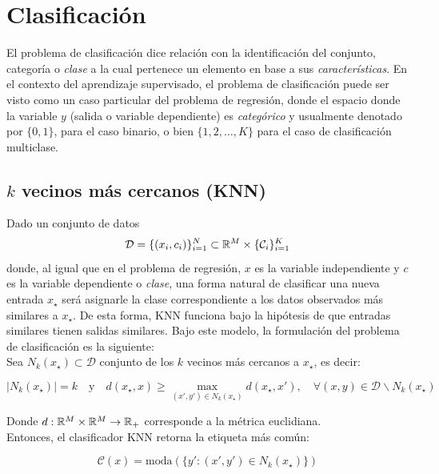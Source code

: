 
\section{Clasificación}
\label{cap:clasificacion}

El problema de clasificación dice relación con la identificación del conjunto, categoría o \emph{clase} a la cual pertenece un elemento en base a sus \emph{características}. En el contexto del aprendizaje supervisado, el problema de clasificación puede ser visto como un caso particular del problema de regresión, donde el espacio donde la variable  $y$ (salida o variable dependiente) es \emph{categórico} y usualmente denotado por $\{0,1\}$, para el caso binario, o bien $\{1,2,\ldots,K\}$ para el caso de clasificación multiclase. 
	
\subsection{$k$ vecinos más cercanos (KNN)}
Dado un conjunto de datos
\begin{equation}
	 	{\mathcal D} = \{(x_i,c_i)\}_{i=1}^N\subset\mathbb{R}^M\times\{{\mathcal C}_i\}_{i=1}^K
\end{equation}
donde, al igual que en el problema de regresión, $x$ es la variable independiente y $c$ es la variable dependiente o \emph{clase}, una forma natural de clasificar una nueva entrada $x_\star$ será asignarle la clase correspondiente a los datos observados más similares a $x_\star$. De esta forma, KNN funciona bajo la hipótesis de que entradas similares tienen salidas similares. Bajo este modelo, la formulación del problema de clasificación es la siguiente:\\

Sea $N_k(x_\star)\subset \mathcal{D}$ conjunto de los $k$ vecinos más cercanos a $x_\star$, es decir:

\begin{equation}
	|N_k(x_\star)|=k\quad\text{y}\quad d(x_\star,x)\geq \max_{(x',y')\in N_k(x_\star)} d(x_\star,x'),\quad\forall (x,y)\in \mathcal{D}\backslash N_k(x_\star)
\end{equation}

Donde $d:\mathbb{R}^M\times\mathbb{R}^M\to\mathbb{R}_+$ corresponde a la métrica euclidiana.\\

Entonces, el clasificador KNN retorna la etiqueta más común:

\begin{equation}
	\mathcal{C}(x) = \text{moda}\left(\{y':(x',y')\in N_k(x_\star)\}\right)
\end{equation}

